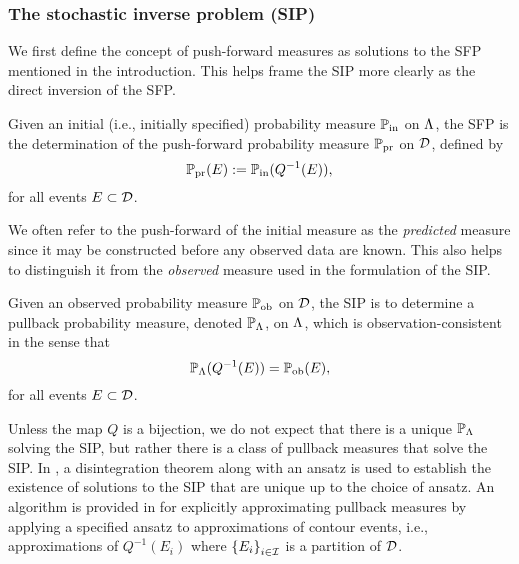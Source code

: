 \subsubsection{The stochastic inverse problem (SIP)}

We first define the concept of push-forward measures as solutions to the SFP mentioned in the introduction.
This helps frame the SIP more clearly as the direct inversion of the SFP.
\begin{definition}\label{def:forward-problem}
  Given an initial (i.e., initially specified) probability measure $\operatorname*{\mathbb{P}_{in}}$ on ${\Lambda}$, the SFP is the determination of the push-forward probability measure $\operatorname*{\mathbb{P}_{pr}}$ on $\mathcal{D}$, defined by
\begin{equation*}
\operatorname*{\mathbb{P}_{pr}}(E) := \operatorname*{\mathbb{P}_{in}}(Q^{-1}(E)),
\end{equation*}
for all events $E\subset\mathcal{D}$.
\end{definition}

We often refer to the push-forward of the initial measure as the {\em predicted} measure since it may be constructed before any observed data are known.
This also helps to distinguish it from the {\em observed} measure used in the formulation of the SIP.
\begin{definition}\label{def:inverse-problem}
Given an observed probability measure $\operatorname*{\mathbb{P}_{ob}}$ on $\mathcal{D}$, the SIP is to determine a pullback probability measure, denoted $\mathbb{P}_{\Lambda}$, on ${\Lambda}$, which is observation-consistent in the sense that
\begin{equation}\label{eq:data-consistent}
\mathbb{P}_{\Lambda}(Q^{-1}(E)) = \operatorname*{\mathbb{P}_{ob}}(E),
\end{equation}
for all events $E\subset\mathcal{D}$.
\end{definition}

Unless the map $Q$ is a bijection, we do not expect that there is a unique $\mathbb{P}_{\Lambda}$ solving the SIP, but rather there is a class of pullback measures that solve the SIP.
In \cite{BET+14}, a disintegration theorem \cite{Chang_Pollard} along with an ansatz is used to establish the existence of solutions to the SIP that are unique up to the choice of ansatz.
An algorithm is provided in \cite{BET+14} for explicitly approximating pullback measures by applying a specified ansatz to approximations of contour events, i.e., approximations of $Q^{-1}(E_i)$ where $\left\{E_i\right\}_{i\in\mathcal{I}}$ is a partition of $\mathcal{D}$.

